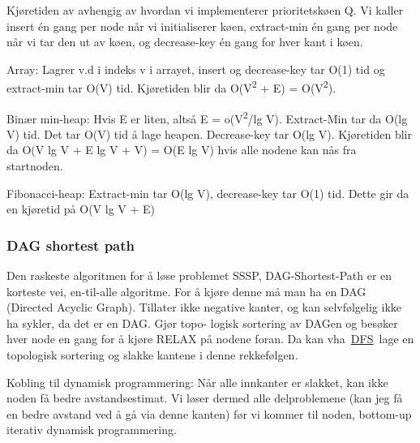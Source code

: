 \documentclass[12pt]{report}
\begin{document}


\vspace{\baselineskip}
Kjøretiden av avhengig av hvordan vi implementerer prioritetskøen Q. Vi kaller insert én gang per node når vi initialiserer køen, extract-min én gang per node når vi tar den ut av køen, og decrease-key én gang for hver kant i køen. \par

Array: Lagrer v.d i indeks v i arrayet, insert og decrease-key tar O(1) tid og extract-min tar O(V) tid. Kjøretiden blir da O(V\textsuperscript{2} + E) = O(V\textsuperscript{2}). \par

Binær min-heap: Hvis E er liten, altså E = o(V\textsuperscript{2}/lg V). Extract-Min tar da O(lg V) tid. Det tar O(V) tid å lage heapen. Decrease-key tar O(lg V). Kjøretiden blir da O(V lg V + E lg V + V) = O(E lg V) hvis alle nodene kan nås fra startnoden. \par

Fibonacci-heap: Extract-min tar O(lg V), decrease-key tar O(1) tid. Dette gir da en kjøretid på O(V lg V + E)\par

\setlength{\parskip}{6.0pt}

\vspace{\baselineskip}\subsubsection*{DAG shortest path}
\setlength{\parskip}{0.0pt}
Den raskeste algoritmen for å løse problemet SSSP, DAG-Shortest-Path er en korteste vei, en-til-alle algoritme. For å kjøre denne må man ha en DAG (Directed Acyclic Graph). Tillater ikke negative kanter, og kan selvfølgelig ikke ha sykler, da det er en DAG. Gjør topo- logisk sortering av DAGen og besøker hver node en gang for å kjøre RELAX på nodene foran. Da kan vha \href{https://www.wikipendium.no/TDT4120_Algoritmer_og_datastrukturer/nb/}{\textcolor[HTML]{006699}{DFS}} lage en topologisk sortering og slakke kantene i denne rekkefølgen.\par

Kobling til dynamisk programmering: Når alle innkanter er slakket, kan ikke noden få bedre avstandsestimat. Vi løser dermed alle delproblemene (kan jeg få en bedre avstand ved å gå via denne kanten) før vi kommer til noden, bottom-up iterativ dynamisk programmering.\par
\end{document}
